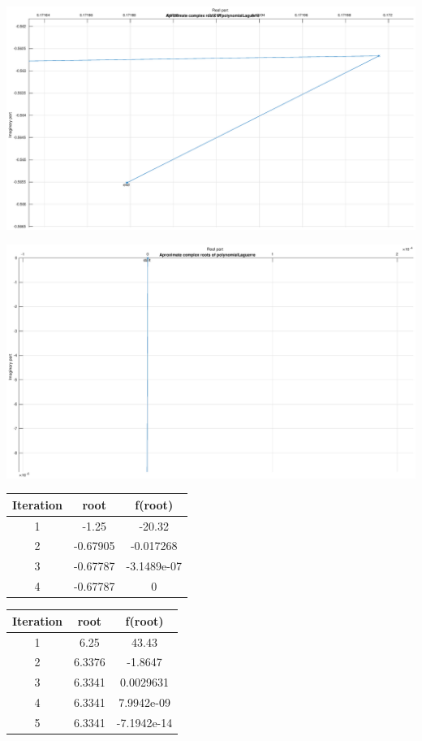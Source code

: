 \documentclass[12pt]{report}
\begin{document}
\begin{center}
   \includegraphics[scale=0.25]{task3complexright.eps}
\end{center}

\begin{center}
   \includegraphics[scale=0.25]{task3complexup.eps}
\end{center}

\begin{center}
  \begin{tabular}{| c  c c |}
\hline
Iteration & root         & f(root) \\
\hline
1    &     -1.25   &       -20.32 \\
\hline
2    &  -0.67905   &    -0.017268 \\
\hline
3    &  -0.67787   &  -3.1489e-07 \\
\hline
4    & -0.67787    &           0 \\
\hline
\hline
\hline

\end{tabular}
\end{center}

\begin{center}
  \begin{tabular}{| c  c c |}
\hline
Iteration & root         & f(root) \\
\hline
1   &     6.25   &        43.43 \\
\hline
2   &   6.3376   &      -1.8647 \\
\hline
3   &  6.3341    &   0.0029631 \\
\hline
4   &   6.3341   &  7.9942e-09\\
\hline
5   &  6.3341    & -7.1942e-14\\
\hline


\end{tabular}
\end{center}
\end{document}
